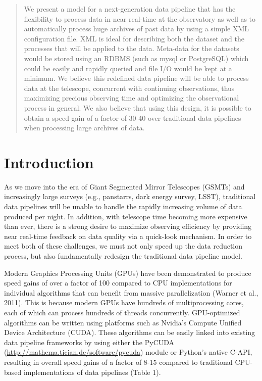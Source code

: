 \begin{abstract}
We present a model for a next-generation data pipeline that has the flexibility to process data in near real-time at the observatory as well as to automatically process huge archives of past data by using a simple XML configuration file.  XML is ideal for describing both the dataset and the processes that will be applied to the data.  Meta-data for the datasets would be stored using an RDBMS (such as mysql or PostgreSQL) which could be easily and rapidly queried and file I/O would be kept at a minimum.  We believe this redefined data pipeline will be able to process data at the telescope, concurrent with continuing observations, thus maximizing precious observing time and optimizing the observational process in general.  We also believe that using this design, it is possible to obtain a speed gain of a factor of 30-40 over traditional data pipelines when processing large archives of data.
\end{abstract}

\section{Introduction}
As we move into the era of Giant Segmented Mirror Telescopes (GSMTs) and increasingly large surveys (e.g., panstarrs, dark energy survey, LSST), traditional data pipelines will be unable to handle the rapidly increasing volume of data produced per night.  In addition, with telescope time becoming more expensive than ever, there is a strong desire to maximize observing efficiency by providing near real-time feedback on data quality via a quick-look mechanism.  In order to meet both of these challenges, we must not only speed up the data reduction process, but also fundamentally redesign the traditional data pipeline model.

Modern Graphics Processing Units (GPUs) have been demonstrated to produce speed gains of over a factor of 100 compared to CPU implementations for individual algorithms that can benefit from massive parallelization (Warner et al., 2011).  This is because modern GPUs have hundreds of multiprocessing cores, each of which can process hundreds of threads concurrently. GPU-optimized algorithms can be written using platforms such as Nvidia's Compute Unified Device Architecture (CUDA).  These algorithms can be easily linked into existing data pipeline frameworks by using either the PyCUDA (\url{http://mathema.tician.de/software/pycuda}) module or Python's native C-API, resulting in overall speed gains of a factor of 8-15 compared to traditional CPU-based implementations of data pipelines (Table 1).

